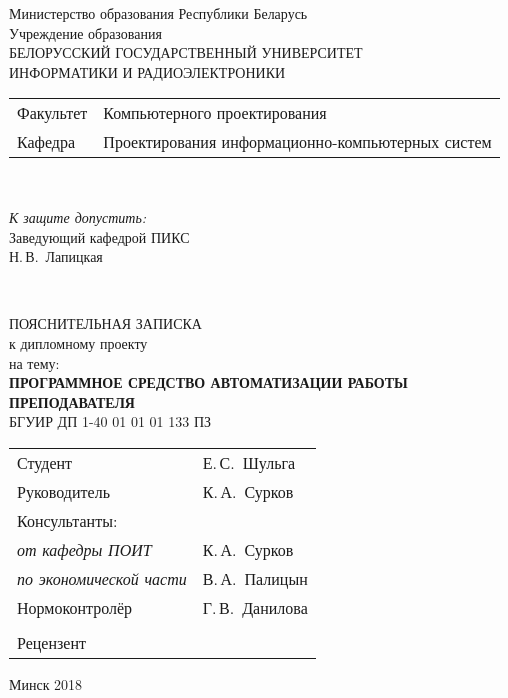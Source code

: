 \begin{titlepage}
  \begin{center}
    Министерство образования Республики Беларусь\\[1em]
    Учреждение образования\\
    БЕЛОРУССКИЙ ГОСУДАРСТВЕННЫЙ УНИВЕРСИТЕТ \\
    ИНФОРМАТИКИ И РАДИОЭЛЕКТРОНИКИ\\[1em]

    \begin{minipage}{\textwidth}
      \begin{flushleft}
        \begin{tabular}{ l l }
          Факультет & Компьютерного проектирования\\
          Кафедра   & Проектирования информационно-компьютерных систем
        \end{tabular}
      \end{flushleft}
    \end{minipage}\\[3em]

    \begin{flushright}
      \begin{minipage}{0.4\textwidth}
        \textit{К защите допустить:}\\[0.8em]
        Заведующий кафедрой ПИКС\\[0.45em]
        \underline{\hspace*{2.8cm}} Н.\,В.~Лапицкая
      \end{minipage}\\[2.2em]
    \end{flushright}

    {ПОЯСНИТЕЛЬНАЯ ЗАПИСКА}\\
    {к дипломному проекту}\\
    {на тему:}\\[1em]
    \textbf{\large\MakeUppercase{Программное средство автоматизации работы преподавателя}}\\[1em]


    {БГУИР ДП 1-40 01 01 01 133 ПЗ}\\[2em]
    
    \begin{tabular}{ p{}p{} }
      Студент & Е.\,С.~Шульга \\
      Руководитель & К.\,А.~Сурков \\
      Консультанты: &\\
      \hspace*{3ex}\emph{от кафедры ПОИТ} & К.\,А.~Сурков \\
      \hspace*{3ex}\emph{по экономической части} & В.\,А.~Палицын \\
      Нормоконтролёр & Г.\,В.~Данилова\\
      & \\
      Рецензент &
    \end{tabular}
    
    \vfill
    {\normalsize Минск 2018}
  \end{center}
\end{titlepage}
